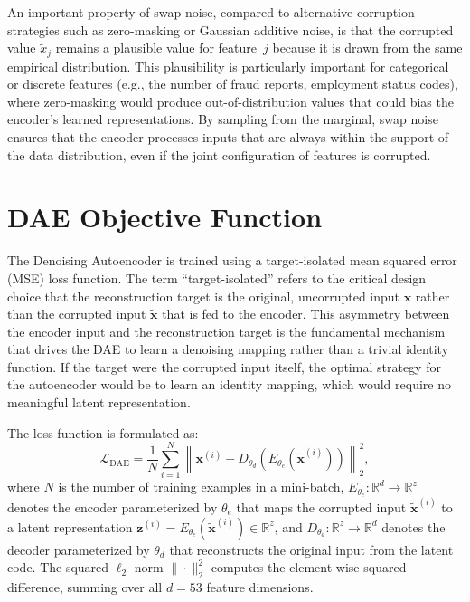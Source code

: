 An important property of swap noise, compared to alternative corruption strategies such as zero-masking or Gaussian additive noise, is that the corrupted value $\tilde{x}_j$ remains a plausible value for feature~$j$ because it is drawn from the same empirical distribution. This plausibility is particularly important for categorical or discrete features (e.g., the number of fraud reports, employment status codes), where zero-masking would produce out-of-distribution values that could bias the encoder's learned representations. By sampling from the marginal, swap noise ensures that the encoder processes inputs that are always within the support of the data distribution, even if the joint configuration of features is corrupted.

\section{DAE Objective Function}
\label{app:dae-objective}

The Denoising Autoencoder is trained using a target-isolated mean squared error (MSE) loss function. The term ``target-isolated'' refers to the critical design choice that the reconstruction target is the original, uncorrupted input $\mathbf{x}$ rather than the corrupted input $\tilde{\mathbf{x}}$ that is fed to the encoder. This asymmetry between the encoder input and the reconstruction target is the fundamental mechanism that drives the DAE to learn a denoising mapping rather than a trivial identity function. If the target were the corrupted input itself, the optimal strategy for the autoencoder would be to learn an identity mapping, which would require no meaningful latent representation.

The loss function is formulated as:
\begin{equation}
\mathcal{L}_{\text{DAE}} = \frac{1}{N} \sum_{i=1}^{N} \left\| \mathbf{x}^{(i)} - D_{\theta_d}\!\left(E_{\theta_e}\!\left(\tilde{\mathbf{x}}^{(i)}\right)\right) \right\|^2_2,
\label{eq:dae-loss}
\end{equation}
where $N$ is the number of training examples in a mini-batch, $E_{\theta_e}: \mathbb{R}^d \to \mathbb{R}^z$ denotes the encoder parameterized by $\theta_e$ that maps the corrupted input $\tilde{\mathbf{x}}^{(i)}$ to a latent representation $\mathbf{z}^{(i)} = E_{\theta_e}(\tilde{\mathbf{x}}^{(i)}) \in \mathbb{R}^z$, and $D_{\theta_d}: \mathbb{R}^z \to \mathbb{R}^d$ denotes the decoder parameterized by $\theta_d$ that reconstructs the original input from the latent code. The squared $\ell_2$-norm $\|\cdot\|^2_2$ computes the element-wise squared difference, summing over all $d = 53$ feature dimensions.

